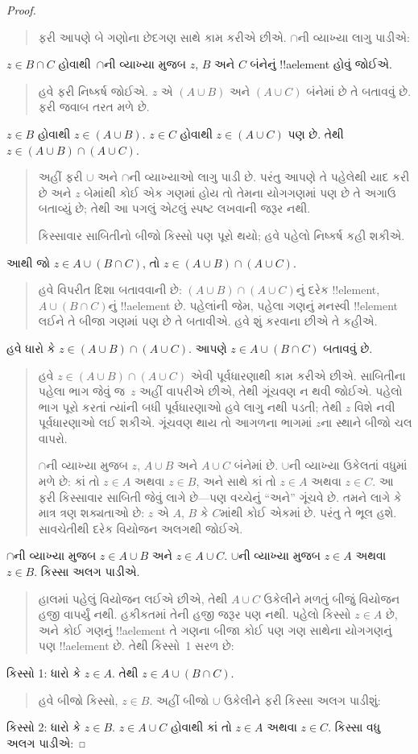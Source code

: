 \documentclass[../../../include/open-logic-section]{subfiles}
\begin{document}
\begin{proof}
\begin{quote}
ફરી આપણે બે ગણોના છેદગણ સાથે કામ કરીએ છીએ. $\cap$ની
વ્યાખ્યા લાગુ પાડીએ:
\end{quote}
$z \in B \cap C$ હોવાથી~$\cap$ની વ્યાખ્યા મુજબ $z$, $B$
અને $C$ બંનેનું !!a{element} હોવું જોઈએ.
\begin{quote}
હવે ફરી નિષ્કર્ષ જોઈએ. $z$ એ $(A \cup B)$ અને $(A \cup C)$
બંનેમાં છે તે બતાવવું છે. ફરી જવાબ તરત મળે છે.
\end{quote}
$z \in B$ હોવાથી $z \in (A \cup B)$. $z \in C$ હોવાથી
$z \in (A
\cup C)$ પણ છે. તેથી $z \in (A \cup B) \cap (A \cup C)$.
\begin{quote}
અહીં ફરી $\cup$ અને $\cap$ની વ્યાખ્યાઓ લાગુ પાડી છે.
પરંતુ આપણે તે પહેલેથી યાદ કરી છે અને $z$ બેમાંથી કોઈ એક
ગણમાં હોય તો તેમના યોગગણમાં પણ છે તે અગાઉ બતાવ્યું છે;
તેથી આ પગલું એટલું સ્પષ્ટ લખવાની જરૂર નથી.

કિસ્સાવાર સાબિતીનો બીજો કિસ્સો પણ પૂરો થયો; હવે પહેલો
નિષ્કર્ષ કહી શકીએ.
\end{quote}
આથી જો $z \in A \cup (B \cap C)$, તો $z \in (A \cup B) \cap (A \cup C)$.
\begin{quote}
હવે વિપરીત દિશા બતાવવાની છે: $(A \cup B) \cap (A \cup C)$નું
દરેક !!{element}, $A \cup (B \cap
C)$નું !!a{element} છે. પહેલાંની જેમ, પહેલા ગણનું મનસ્વી
!!{element} લઈને તે બીજા ગણમાં પણ છે તે બતાવીએ. હવે શું
કરવાના છીએ તે કહીએ.
\end{quote}
હવે ધારો કે $z \in (A \cup B) \cap (A \cup C)$. આપણે
$z \in A \cup (B \cap C)$ બતાવવું છે.
\begin{quote}
હવે $z \in (A \cup B) \cap (A
\cup C)$ એવી પૂર્વધારણાથી કામ કરીએ છીએ. સાબિતીના પહેલા ભાગ
જેવું જ~$z$ અહીં વાપરીએ છીએ, તેથી ગૂંચવણ ન થવી જોઈએ. પહેલો
ભાગ પૂરો કરતાં ત્યાંની બધી પૂર્વધારણાઓ હવે લાગુ નથી પડતી;
તેથી $z$ વિશે નવી પૂર્વધારણાઓ લઈ શકીએ. ગૂંચવણ થાય તો આગળના
ભાગમાં $z$ના સ્થાને બીજો ચલ વાપરો.

$\cap$ની વ્યાખ્યા મુજબ $z$, $A \cup B$ અને $A \cup C$
બંનેમાં છે. $\cup$ની વ્યાખ્યા ઉકેલતાં વધુમાં મળે છે: કાં તો
$z \in A$ અથવા $z \in B$, અને સાથે કાં તો $z \in A$
અથવા $z \in
C$. આ ફરી કિસ્સાવાર સાબિતી જેવું લાગે છે---પણ વચ્ચેનું
``અને'' ગૂંચવે છે. તમને લાગે કે માત્ર ત્રણ શક્યતાઓ છે:
$z$ એ $A$, $B$ કે $C$માંથી કોઈ એકમાં છે. પરંતુ તે ભૂલ
હશે. સાવચેતીથી દરેક વિયોજન અલગથી જોઈએ.
\end{quote}
$\cap$ની વ્યાખ્યા મુજબ $z \in A \cup B$ અને $z \in A \cup C$.
$\cup$ની વ્યાખ્યા મુજબ $z \in A$ અથવા $z \in B$.
કિસ્સા અલગ પાડીએ.
\begin{quote}
હાલમાં પહેલું વિયોજન લઈએ છીએ, તેથી $A \cup C$ ઉકેલીને
મળતું બીજું વિયોજન હજી વાપર્યું નથી. હકીકતમાં તેની હજી જરૂર
પણ નથી. પહેલો કિસ્સો $z \in A$ છે, અને કોઈ ગણનું
!!a{element} તે ગણના બીજા કોઈ પણ ગણ સાથેના યોગગણનું પણ
!!a{element} છે. તેથી કિસ્સો~1 સરળ છે:
\end{quote}
કિસ્સો 1: ધારો કે $z \in A$. તેથી $z \in A \cup (B \cap
C)$.
\begin{quote}
હવે બીજો કિસ્સો, $z \in B$. અહીં બીજો $\cup$ ઉકેલીને
ફરી કિસ્સા અલગ પાડીશું:
\end{quote}
કિસ્સો 2: ધારો કે $z \in B$. $z \in A \cup C$ હોવાથી
કાં તો $z \in
A$ અથવા $z \in C$. કિસ્સા વધુ અલગ પાડીએ:


\end{proof}
\end{document}
